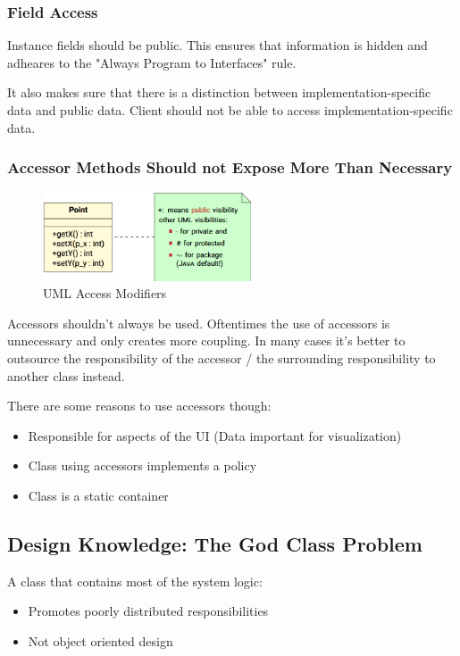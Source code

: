 \documentclass[
../../Software_Engineering_Summary.tex,
]
{subfiles}
\begin{document}
\subsubsection{Field Access}
Instance fields should  be public. This ensures that information is hidden and adheares to the "Always Program to Interfaces" rule. 

It also makes sure that there is a distinction between implementation-specific data and public data. Client should not be able to access implementation-specific data.

\subsubsection{Accessor Methods Should not Expose More Than Necessary}
\begin{figure}
    [htp]
    \centering
    \includegraphics[width = 0.55\textwidth]{Pics/UMLAccessModifiers.png}
    \caption{UML Access Modifiers}
\end{figure}

Accessors shouldn't always be used. Oftentimes the use of accessors is unnecessary and only creates more coupling. In many cases it's better to outsource the responsibility of the accessor / the surrounding responsibility to another class instead.

There are some reasons to use accessors though:
\begin{itemize}
    \item Responsible for aspects of the UI (Data important for visualization)
    \item Class using accessors implements a policy
    \item Class is a static container
\end{itemize}

\subsection{Design Knowledge: The God Class Problem}

\begin{defbox}
    A class that contains most of the system logic:
    \begin{itemize}
        \item Promotes poorly distributed responsibilities
        \item Not object oriented design
    \end{itemize}
\end{defbox}
\end{document}
